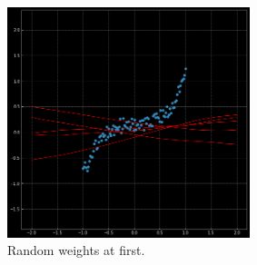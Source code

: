         \begin{figure}[H]
        \begin{center}
        \includegraphics[width=200pt]{figs/05-random_at_first.png}
        \end{center} 
        \caption{Random weights at first.}
        \end{figure}


